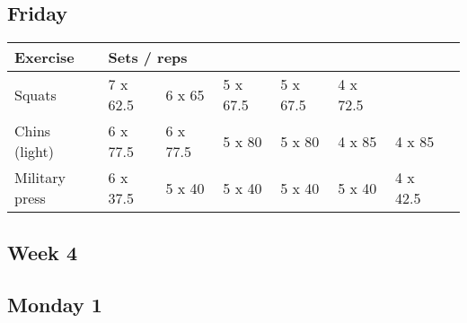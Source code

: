 \documentclass[12pt, a4paper]{article}%
\begin{document}
  \subsection*{\hspace{0.5em} Friday }


  \begin{tabular}{l|lllllll}
  \hspace{0.75em} \textbf{Exercise} & \multicolumn{ 7 }{l}{ \textbf{Sets / reps} } \\ \hline

            \hspace{0.75em} Squats
            & 7 x 62.5
            & 6 x 65
            & 5 x 67.5
            & 5 x 67.5
            & 4 x 72.5
            & 
            & 
            \\


            \hspace{0.75em} Chins (light)
            & 6 x 77.5
            & 6 x 77.5
            & 5 x 80
            & 5 x 80
            & 4 x 85
            & 4 x 85
            & 
            \\


            \hspace{0.75em} Military press
            & 6 x 37.5
            & 5 x 40
            & 5 x 40
            & 5 x 40
            & 5 x 40
            & 4 x 42.5
            & 
            \\


  \end{tabular}


\clearpage \subsection*{\hspace{0.25em} Week 4 }
  \subsection*{\hspace{0.5em} Monday 1 }
\end{document}
